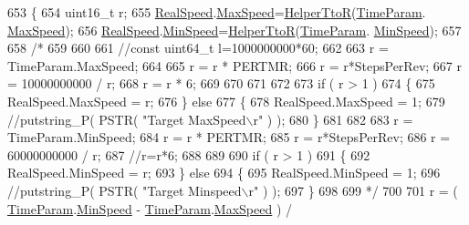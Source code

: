 \begin{DoxyCode}
653 \{
654     uint16\_t r;
655     \hyperlink{drv__8825_8c_a2e720ed1ed0ef90dba27c1f246048dcd}{RealSpeed}.\hyperlink{structMotor__Parameters_a501458e333945f49f03c295e2f49e3b9}{MaxSpeed}=\hyperlink{group__biba__drv_gabc1e78364b977fdff7ae3b642e720f58}{HelperTtoR}(\hyperlink{drv__8825_8c_a7d20b8cec6f96108790d4bf76b9c469d}{TimeParam}.
      \hyperlink{structMotor__Parameters_a501458e333945f49f03c295e2f49e3b9}{MaxSpeed});
656     \hyperlink{drv__8825_8c_a2e720ed1ed0ef90dba27c1f246048dcd}{RealSpeed}.\hyperlink{structMotor__Parameters_aaf0ac3ed818f5c89cc86ea1d9174dc43}{MinSpeed}=\hyperlink{group__biba__drv_gabc1e78364b977fdff7ae3b642e720f58}{HelperTtoR}(\hyperlink{drv__8825_8c_a7d20b8cec6f96108790d4bf76b9c469d}{TimeParam}.
      \hyperlink{structMotor__Parameters_aaf0ac3ed818f5c89cc86ea1d9174dc43}{MinSpeed});
657 
658 \textcolor{comment}{/*}
659 \textcolor{comment}{    }
660 \textcolor{comment}{}
661 \textcolor{comment}{    //const uint64\_t l=1000000000*60;}
662 \textcolor{comment}{}
663 \textcolor{comment}{    r = TimeParam.MaxSpeed;}
664 \textcolor{comment}{}
665 \textcolor{comment}{    r = r * PERTMR;}
666 \textcolor{comment}{    r = r*StepsPerRev;}
667 \textcolor{comment}{    r = 10000000000 / r;}
668 \textcolor{comment}{    r = r * 6;}
669 \textcolor{comment}{}
670 \textcolor{comment}{}
671 \textcolor{comment}{}
672 \textcolor{comment}{}
673 \textcolor{comment}{    if ( r > 1 )}
674 \textcolor{comment}{    \{}
675 \textcolor{comment}{        RealSpeed.MaxSpeed = r;}
676 \textcolor{comment}{    \} else}
677 \textcolor{comment}{    \{}
678 \textcolor{comment}{        RealSpeed.MaxSpeed = 1;}
679 \textcolor{comment}{        //putstring\_P( PSTR( "Target MaxSpeed\(\backslash\)r" ) );}
680 \textcolor{comment}{    \}}
681 \textcolor{comment}{}
682 \textcolor{comment}{}
683 \textcolor{comment}{    r = TimeParam.MinSpeed;}
684 \textcolor{comment}{    r = r * PERTMR;}
685 \textcolor{comment}{    r = r*StepsPerRev;}
686 \textcolor{comment}{    r = 60000000000 / r;}
687 \textcolor{comment}{    //r=r*6;}
688 \textcolor{comment}{}
689 \textcolor{comment}{}
690 \textcolor{comment}{    if ( r > 1 )}
691 \textcolor{comment}{    \{}
692 \textcolor{comment}{        RealSpeed.MinSpeed = r;}
693 \textcolor{comment}{    \} else}
694 \textcolor{comment}{    \{}
695 \textcolor{comment}{        RealSpeed.MinSpeed = 1;}
696 \textcolor{comment}{        //putstring\_P( PSTR( "Target Minspeed\(\backslash\)r" ) );}
697 \textcolor{comment}{    \}}
698 \textcolor{comment}{}
699 \textcolor{comment}{*/}
700 
701     r = ( \hyperlink{drv__8825_8c_a7d20b8cec6f96108790d4bf76b9c469d}{TimeParam}.\hyperlink{structMotor__Parameters_aaf0ac3ed818f5c89cc86ea1d9174dc43}{MinSpeed} - \hyperlink{drv__8825_8c_a7d20b8cec6f96108790d4bf76b9c469d}{TimeParam}.\hyperlink{structMotor__Parameters_a501458e333945f49f03c295e2f49e3b9}{MaxSpeed} ) / 

\end{DoxyCode}
